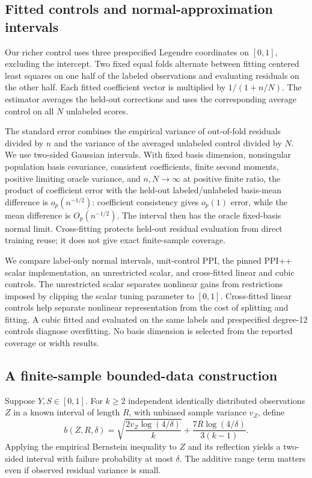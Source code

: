 \subsection{Fitted controls and normal-approximation intervals}
Our richer control uses three prespecified Legendre coordinates on $[0,1]$, excluding the intercept. Two fixed equal folds alternate between fitting centered least squares on one half of the labeled observations and evaluating residuals on the other half. Each fitted coefficient vector is multiplied by $1/(1+n/N)$. The estimator averages the held-out corrections and uses the corresponding average control on all $N$ unlabeled scores.

The standard error combines the empirical variance of out-of-fold residuals divided by $n$ and the variance of the averaged unlabeled control divided by $N$. We use two-sided Gaussian intervals. With fixed basis dimension, nonsingular population basis covariance, consistent coefficients, finite second moments, positive limiting oracle variance, and $n,N\to\infty$ at positive finite ratio, the product of coefficient error with the held-out labeled/unlabeled basis-mean difference is $o_p(n^{-1/2})$: coefficient consistency gives $o_p(1)$ error, while the mean difference is $O_p(n^{-1/2})$. The interval then has the oracle fixed-basis normal limit. Cross-fitting protects held-out residual evaluation from direct training reuse; it does not give exact finite-sample coverage.

We compare label-only normal intervals, unit-control PPI, the pinned PPI++ scalar implementation, an unrestricted scalar, and cross-fitted linear and cubic controls. The unrestricted scalar separates nonlinear gains from restrictions imposed by clipping the scalar tuning parameter to $[0,1]$. Cross-fitted linear controls help separate nonlinear representation from the cost of splitting and fitting. A cubic fitted and evaluated on the same labels and prespecified degree-12 controls diagnose overfitting. No basis dimension is selected from the reported coverage or width results.

\subsection{A finite-sample bounded-data construction}
Suppose $Y,S\in[0,1]$. For $k\ge2$ independent identically distributed observations $Z$ in a known interval of length $R$, with unbiased sample variance $v_Z$, define
\begin{equation}
 b(Z,R,\delta)=\sqrt{\frac{2v_Z\log(4/\delta)}k}
             +\frac{7R\log(4/\delta)}{3(k-1)}.
 \label{eq:bernstein}
\end{equation}
Applying the empirical Bernstein inequality to $Z$ and its reflection yields a two-sided interval with failure probability at most $\delta$. The additive range term matters even if observed residual variance is small.

